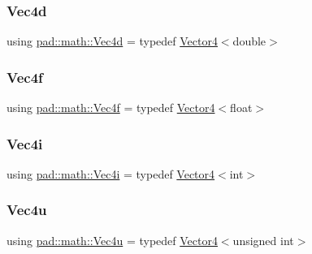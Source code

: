 \mbox{\label{namespacepad_1_1math_a845efb6de5d2237d1a7f27cf87741454}} 
\subsubsection{\texorpdfstring{Vec4d}{Vec4d}}
{\footnotesize\ttfamily using \mbox{\hyperlink{namespacepad_1_1math_a845efb6de5d2237d1a7f27cf87741454}{pad\+::math\+::\+Vec4d}} = typedef \mbox{\hyperlink{structpad_1_1math_1_1_vector4}{Vector4}}$<$double$>$}

\mbox{\label{namespacepad_1_1math_a4eb77014ac7b74bd24cf73bca82ac3a3}} 
\subsubsection{\texorpdfstring{Vec4f}{Vec4f}}
{\footnotesize\ttfamily using \mbox{\hyperlink{namespacepad_1_1math_a4eb77014ac7b74bd24cf73bca82ac3a3}{pad\+::math\+::\+Vec4f}} = typedef \mbox{\hyperlink{structpad_1_1math_1_1_vector4}{Vector4}}$<$float$>$}

\mbox{\label{namespacepad_1_1math_a6b61fad19375a5164da9e1a86403f208}} 
\subsubsection{\texorpdfstring{Vec4i}{Vec4i}}
{\footnotesize\ttfamily using \mbox{\hyperlink{namespacepad_1_1math_a6b61fad19375a5164da9e1a86403f208}{pad\+::math\+::\+Vec4i}} = typedef \mbox{\hyperlink{structpad_1_1math_1_1_vector4}{Vector4}}$<$int$>$}

\mbox{\label{namespacepad_1_1math_ad5b8d7d51edf8173f6a0ddbbb792c803}} 
\subsubsection{\texorpdfstring{Vec4u}{Vec4u}}
{\footnotesize\ttfamily using \mbox{\hyperlink{namespacepad_1_1math_ad5b8d7d51edf8173f6a0ddbbb792c803}{pad\+::math\+::\+Vec4u}} = typedef \mbox{\hyperlink{structpad_1_1math_1_1_vector4}{Vector4}}$<$unsigned int$>$}



